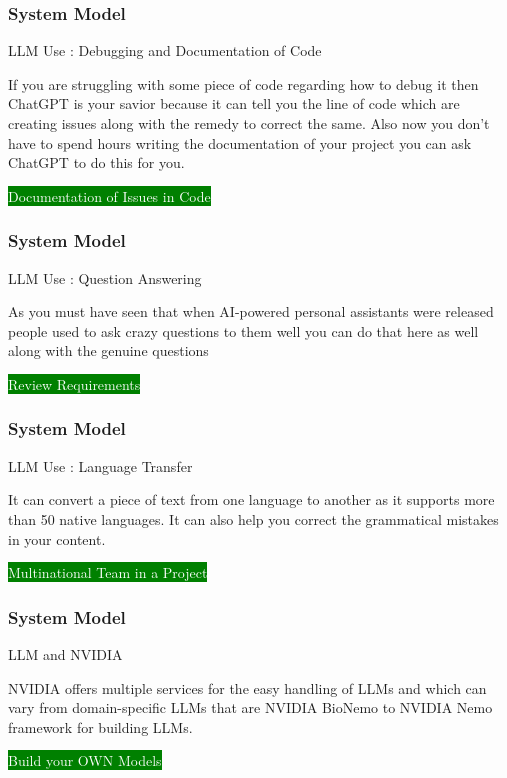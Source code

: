 \newpage
\begin{frame}
\frametitle{ System Model }
\begin{block}{LLM Use :  Debugging and Documentation of Code}
 
 If you are struggling with some piece of code regarding how to debug it then ChatGPT is your savior because it can tell you the line of code which are creating issues along with the remedy to correct the same. Also now you don’t have to spend hours writing the documentation of your project you can ask ChatGPT to do this for you.
 
\colorbox{green}{ \textcolor{white}{ Documentation of Issues in Code } }
 
\end{block}
\end{frame}


\newpage
\begin{frame}
\frametitle{ System Model }
\begin{block}{LLM Use : Question Answering  }

 As you must have seen that when AI-powered personal assistants were released people used to ask crazy questions to them well you can do that here as well along with the genuine questions

  \colorbox{green}{ \textcolor{white}{ Review Requirements  } }
  
\end{block}
\end{frame}

\newpage
\begin{frame}
\frametitle{ System Model }
\begin{block}{LLM Use : Language Transfer }

 It can convert a piece of text from one language to another as it supports more than 50 native languages. It can also help you correct the grammatical mistakes in your content.


  \colorbox{green}{ \textcolor{white}{ Multinational Team in a Project } }
  
\end{block}
\end{frame}

\newpage
\begin{frame}
\frametitle{ System Model }
\begin{block}{LLM and NVIDIA }

NVIDIA offers multiple services for the easy handling of LLMs and which can vary from domain-specific LLMs that are NVIDIA BioNemo to NVIDIA Nemo framework for building LLMs.



\colorbox{green}{ \textcolor{white}{ Build your OWN Models  } }


 
\end{block}
\end{frame}

